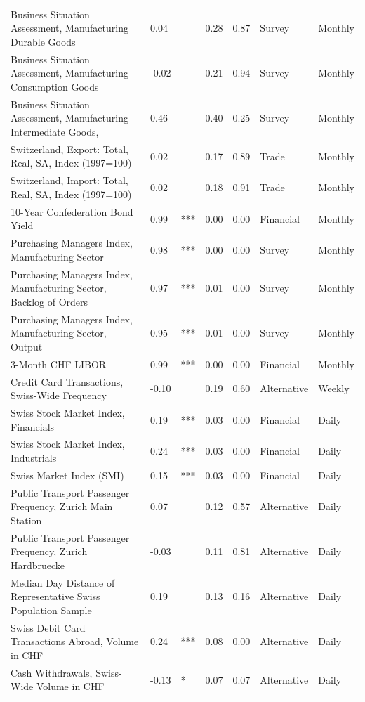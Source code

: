 \begin{table}[ht]
\begin{tabular}{lllrrll}
  Business Situation Assessment, Manufacturing Durable Goods &  0.04 &  & 0.28 & 0.87 & Survey & Monthly \\ 
  Business Situation Assessment, Manufacturing Consumption Goods & -0.02 &  & 0.21 & 0.94 & Survey & Monthly \\ 
  Business Situation Assessment, Manufacturing Intermediate Goods,  &  0.46 &  & 0.40 & 0.25 & Survey & Monthly \\ 
  Switzerland, Export: Total, Real, SA, Index (1997=100) &  0.02 &  & 0.17 & 0.89 & Trade & Monthly \\ 
  Switzerland, Import: Total, Real, SA, Index (1997=100) &  0.02 &  & 0.18 & 0.91 & Trade & Monthly \\ 
  10-Year Confederation Bond Yield &  0.99 & *** & 0.00 & 0.00 & Financial & Monthly \\ 
  Purchasing Managers Index, Manufacturing Sector &  0.98 & *** & 0.00 & 0.00 & Survey & Monthly \\ 
  Purchasing Managers Index, Manufacturing Sector, Backlog of Orders &  0.97 & *** & 0.01 & 0.00 & Survey & Monthly \\ 
  Purchasing Managers Index, Manufacturing Sector, Output &  0.95 & *** & 0.01 & 0.00 & Survey & Monthly \\ 
  3-Month CHF LIBOR &  0.99 & *** & 0.00 & 0.00 & Financial & Monthly \\ 
  Credit Card Transactions, Swiss-Wide Frequency & -0.10 &  & 0.19 & 0.60 & Alternative & Weekly \\ 
  Swiss Stock Market Index, Financials &  0.19 & *** & 0.03 & 0.00 & Financial & Daily \\ 
  Swiss Stock Market Index, Industrials &  0.24 & *** & 0.03 & 0.00 & Financial & Daily \\ 
  Swiss Market Index (SMI)  &  0.15 & *** & 0.03 & 0.00 & Financial & Daily \\ 
  Public Transport Passenger Frequency, Zurich Main Station &  0.07 &  & 0.12 & 0.57 & Alternative & Daily \\ 
  Public Transport Passenger Frequency, Zurich Hardbruecke & -0.03 &  & 0.11 & 0.81 & Alternative & Daily \\ 
  Median Day Distance of Representative Swiss Population Sample &  0.19 &  & 0.13 & 0.16 & Alternative & Daily \\ 
  Swiss Debit Card Transactions Abroad, Volume in CHF &  0.24 & *** & 0.08 & 0.00 & Alternative & Daily \\ 
  Cash Withdrawals, Swiss-Wide Volume in CHF & -0.13 & * & 0.07 & 0.07 & Alternative & Daily \\ 

\end{tabular}
\end{table}
